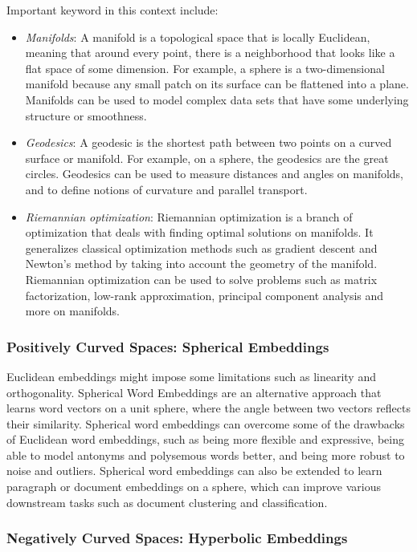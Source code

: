 \documentclass[11pt, a4paper]{amsart}
\begin{document}
Important keyword in this context include:
\begin{itemize}
	\item \emph{Manifolds}:
	A manifold is a topological space that is locally Euclidean, meaning that around every point, there is a neighborhood that looks like a flat space of some dimension.
	For example, a sphere is a two-dimensional manifold because any small patch on its surface can be flattened into a plane.
	Manifolds can be used to model complex data sets that have some underlying structure or smoothness. 
	\item \emph{Geodesics}:
	A geodesic is the shortest path between two points on a curved surface or manifold.
	For example, on a sphere, the geodesics are the great circles.
	Geodesics can be used to measure distances and angles on manifolds, and to define notions of curvature and parallel transport.
	\item \emph{Riemannian optimization}:
	Riemannian optimization is a branch of optimization that deals with finding optimal solutions on manifolds.
	It generalizes classical optimization methods such as gradient descent and Newton’s method by taking into account the geometry of the manifold.
	Riemannian optimization can be used to solve problems such as matrix factorization, low-rank approximation, principal component analysis and more on manifolds.
\end{itemize}


\subsubsection{Positively Curved Spaces: Spherical Embeddings}

Euclidean embeddings might impose some limitations such as linearity and orthogonality.
Spherical Word Embeddings \cite{Meng2019SphericalTE} are an alternative approach that learns word vectors on a unit sphere, where the angle between two vectors reflects their similarity.
Spherical word embeddings can overcome some of the drawbacks of Euclidean word embeddings, such as being more flexible and expressive, being able to model antonyms and polysemous words better, and being more robust to noise and outliers.
Spherical word embeddings can also be extended to learn paragraph or document embeddings on a sphere, which can improve various downstream tasks such as document clustering and classification.

\subsubsection{Negatively Curved Spaces: Hyperbolic Embeddings}
\end{document}
